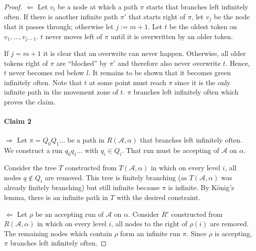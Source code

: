 \documentclass{article}
\begin{document}
\begin{proof}
    $\bm{\Leftarrow}$ Let $v_i$ be a node at which a path $\pi$ starts that branches left infinitely often. If there is another infinite path $\pi'$ that starts right of $\pi$, let $v_j$ be the node that it passes through; otherwise let $j := m+1$. Let $t$ be the oldest token on $v_1, \dots, v_{j-1}$. $t$ never moves left of $\pi$ until it is overwritten by an older token.
    
    If $j = m+1$ it is clear that an overwrite can never happen. Otherwise, all older tokens right of $\pi$ are ``blocked'' by $\pi'$ and therefore also never overwrite $t$. Hence, $t$ never becomes red below $l$. It remains to be shown that it becomes green infinitely often. Note that $t$ at some point must reach $\pi$ since it is the only infinite path in the movement zone of $t$. $\pi$ branches left infinitely often which proves the claim.
    
    \paragraph{Claim 2} $\bm{\Rightarrow}$ Let $\pi = Q_0 Q_1 \dots$ be a path in $R(\mathcal{A}, \alpha)$ that branches left infinitely often. We construct a run $q_0 q_1 \dots$ with $q_i \in Q_i$. That run must be accepting of $\mathcal{A}$ on $\alpha$.
    
    Consider the tree $T$ constructed from $T(\mathcal{A}, \alpha)$ in which on every level $i$, all nodes $q \notin Q_i$ are removed. This tree is finitely branching (as $T(\mathcal{A}, \alpha)$ was already finitely branching) but still infinite because $\pi$ is infinite. By König's lemma, there is an infinite path in $T$ with the desired constraint.
    
    $\bm{\Leftarrow}$ Let $\rho$ be an accepting run of $\mathcal{A}$ on $\alpha$. Consider $R'$ constructed from $R(\mathcal{A}, \alpha)$ in which on every level $i$, all nodes to the right of $\rho(i)$ are removed. The remaining nodes which contain $\rho$ form an infinite run $\pi$. Since $\rho$ is accepting, $\pi$ branches left infinitely often.
\end{proof}
\end{document}
